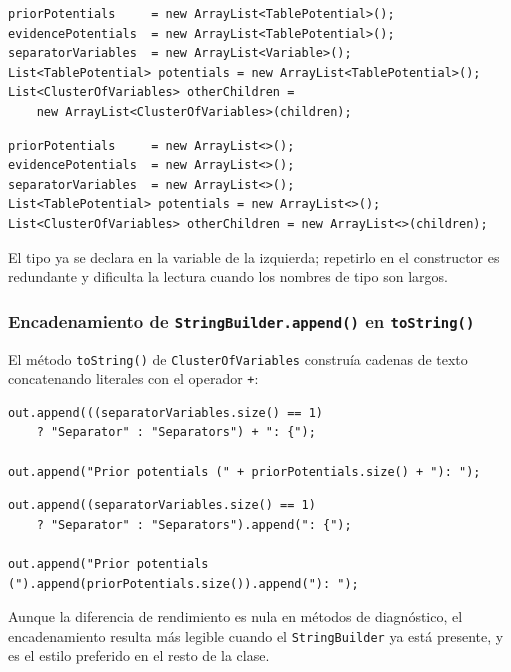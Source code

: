 \documentclass[12pt,a4paper]{article}
\begin{document}
\begin{lstlisting}[caption={Antes: parámetro de tipo explícito}]
priorPotentials     = new ArrayList<TablePotential>();
evidencePotentials  = new ArrayList<TablePotential>();
separatorVariables  = new ArrayList<Variable>();
List<TablePotential> potentials = new ArrayList<TablePotential>();
List<ClusterOfVariables> otherChildren =
    new ArrayList<ClusterOfVariables>(children);
\end{lstlisting}

\begin{lstlisting}[caption={Después: operador diamante}]
priorPotentials     = new ArrayList<>();
evidencePotentials  = new ArrayList<>();
separatorVariables  = new ArrayList<>();
List<TablePotential> potentials = new ArrayList<>();
List<ClusterOfVariables> otherChildren = new ArrayList<>(children);
\end{lstlisting}

El tipo ya se declara en la variable de la izquierda; repetirlo en el
constructor es redundante y dificulta la lectura cuando los nombres de tipo
son largos.

\subsubsection*{Encadenamiento de \texttt{StringBuilder.append()} en \texttt{toString()}}

El método \texttt{toString()} de \texttt{ClusterOfVariables} construía
cadenas de texto concatenando literales con el operador \texttt{+}:

\begin{lstlisting}[caption={Antes: concatenación con +}]
out.append(((separatorVariables.size() == 1)
    ? "Separator" : "Separators") + ": {");

out.append("Prior potentials (" + priorPotentials.size() + "): ");
\end{lstlisting}

\begin{lstlisting}[caption={Después: encadenamiento de append}]
out.append((separatorVariables.size() == 1)
    ? "Separator" : "Separators").append(": {");

out.append("Prior potentials (").append(priorPotentials.size()).append("): ");
\end{lstlisting}

Aunque la diferencia de rendimiento es nula en métodos de diagnóstico,
el encadenamiento resulta más legible cuando el \texttt{StringBuilder} ya está
presente, y es el estilo preferido en el resto de la clase.
\end{document}
